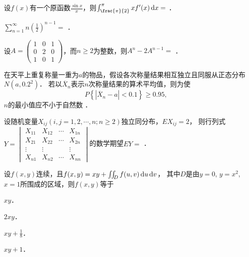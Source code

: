 \documentclass[plain,noanswer,medmath]{../../template/jnuexam}
\begin{document}






\begin{problem}
设$f(x)$有一个原函数$\frac{\sin x}{x}$，则$\int_{\frac{\pi}{2}}^{\pi}xf'(x)\dx =$ \fillin{}．
\end{problem}


\begin{problem}
$\sum_{n = 1}^{\infty}n\left(\frac{1}{2} \right)^{n - 1} =$ \fillin{}．
\end{problem}


\begin{problem}
设$A = \begin{pmatrix}
  1 & 0 & 1 \\
  0 & 2 & 0 \\
  1 & 0 & 1
\end{pmatrix}$，而$n \ge 2$为整数，则$A^n - 2A^{n - 1} =$ \fillin{}．
\end{problem}


\begin{problem}
在天平上重复称量一重为$a$的物品，假设各次称量结果相互独立且同服从正态分布$N(a, 0.2^2)$．
若以$\overline{X}_n$表示$n$次称量结果的算术平均值，则为使
$$P\left\{\left| \overline{X}_n - a \right| < 0.1 \right\} \ge 0.95,$$
$n$的最小值应不小于自然数 \fillin{}．
\end{problem}


\begin{problem}
设随机变量$X_{ij}\left(i,j = 1,2, \cdots ,n;n \ge 2 \right)$独立同分布，$EX_{ij} = 2$，
则行列式$Y = \begin{vmatrix}
  X_{11} & X_{12} & \cdots & X_{1n} \\
  X_{21} & X_{22} & \cdots & X_{2n} \\
  \vdots & \vdots &        & \vdots \\
  X_{n1} & X_{n2} & \cdots & X_{nn}
\end{vmatrix}$的数学期望$EY =$ \fillin{}．
\end{problem}






\begin{problem}
设$f(x,y)$连续，且$f(x,y) = xy + \iint_D f(u,v)\mathop{}\!\mathrm{d} u\mathop{}\!\mathrm{d} v$，
其中$D$是由$y = 0$, $y = x^2$, $x = 1$所围成的区域，则$f(x,y)$等于\pickout{}
\begin{abcd}
\item $xy$．
\item $2xy$．
\item $xy + \frac{1}{8}$．
\item $xy + 1$．
\end{abcd}
\end{problem}
\end{document}
